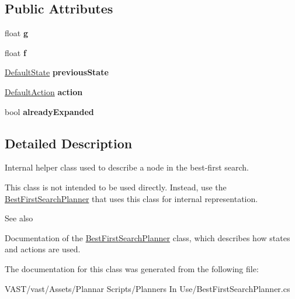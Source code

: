 \subsection*{Public Attributes}
\begin{DoxyCompactItemize}
\item 
\hypertarget{class_best_first_search_node_ad6c65af451d6e2904c842833d49876c8}{float {\bfseries g}}\label{class_best_first_search_node_ad6c65af451d6e2904c842833d49876c8}

\item 
\hypertarget{class_best_first_search_node_a586a71b36b6621e0290f903c5b97adfd}{float {\bfseries f}}\label{class_best_first_search_node_a586a71b36b6621e0290f903c5b97adfd}

\item 
\hypertarget{class_best_first_search_node_a9019b1e6f7cb4783ffb318cd58f726f4}{\hyperlink{class_default_state}{Default\-State} {\bfseries previous\-State}}\label{class_best_first_search_node_a9019b1e6f7cb4783ffb318cd58f726f4}

\item 
\hypertarget{class_best_first_search_node_a8ec9adf5c8c0345a67f99e552da8e4e8}{\hyperlink{class_default_action}{Default\-Action} {\bfseries action}}\label{class_best_first_search_node_a8ec9adf5c8c0345a67f99e552da8e4e8}

\item 
\hypertarget{class_best_first_search_node_a27b1fe54e186d21b8cabf78c87cabe02}{bool {\bfseries already\-Expanded}}\label{class_best_first_search_node_a27b1fe54e186d21b8cabf78c87cabe02}

\end{DoxyCompactItemize}


\subsection{Detailed Description}
Internal helper class used to describe a node in the best-\/first search. 

This class is not intended to be used directly. Instead, use the \hyperlink{class_best_first_search_planner}{Best\-First\-Search\-Planner} that uses this class for internal representation.

\begin{DoxySeeAlso}{See also}

\begin{DoxyItemize}
\item Documentation of the \hyperlink{class_best_first_search_planner}{Best\-First\-Search\-Planner} class, which describes how states and actions are used. 
\end{DoxyItemize}
\end{DoxySeeAlso}


The documentation for this class was generated from the following file\-:\begin{DoxyCompactItemize}
\item 
V\-A\-S\-T/vast/\-Assets/\-Plannar Scripts/\-Planners In Use/Best\-First\-Search\-Planner.\-cs\end{DoxyCompactItemize}
